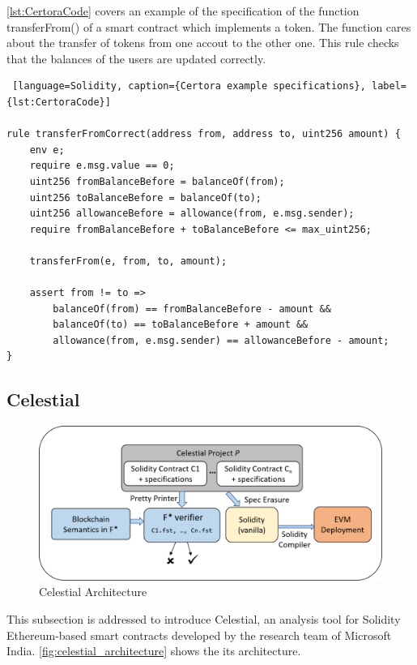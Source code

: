 \autoref{lst:CertoraCode} covers an example of the specification of the function transferFrom() of a smart contract which implements a token. 
The function cares about the transfer of tokens from one accout to the other one. This rule checks that the balances of the users are updated correctly. 
\begin{lstlisting} [language=Solidity, caption={Certora example specifications}, label={lst:CertoraCode}]

rule transferFromCorrect(address from, address to, uint256 amount) {
    env e;
    require e.msg.value == 0;
    uint256 fromBalanceBefore = balanceOf(from);
    uint256 toBalanceBefore = balanceOf(to);
    uint256 allowanceBefore = allowance(from, e.msg.sender);
    require fromBalanceBefore + toBalanceBefore <= max_uint256;

    transferFrom(e, from, to, amount);

    assert from != to =>
        balanceOf(from) == fromBalanceBefore - amount &&
        balanceOf(to) == toBalanceBefore + amount &&
        allowance(from, e.msg.sender) == allowanceBefore - amount;
}

\end{lstlisting}



\subsection{Celestial}

\label{sec:Specification:Celestial}
\begin{figure}
    \centering
    \includegraphics[width=13cm]{logos/CelestialArchitecture.png}
    \caption{Celestial Architecture}
    \label{fig:celestial_architecture}
\end{figure}

This subsection is addressed to introduce Celestial, 
an analysis tool for Solidity Ethereum-based smart contracts developed by the research team of Microsoft India.
\autoref{fig:celestial_architecture} shows the its architecture. 

